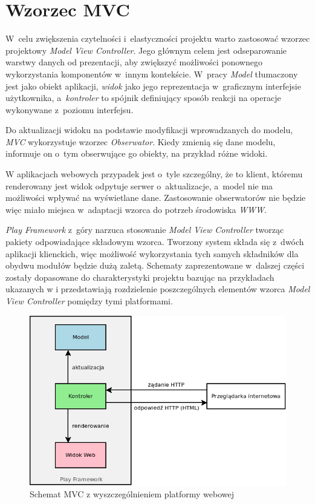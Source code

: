 \documentclass[11pt]{aghdpl}
\begin{document}
\section{Wzorzec MVC}
\label{sec:wzorzecMVC}

W~celu zwiększenia czytelności i~elastyczności projektu warto zastosować wzorzec projektowy \emph{Model View Controller}. Jego głównym celem jest odseparowanie warstwy danych od prezentacji, aby zwiększyć możliwości ponownego wykorzystania komponentów w~innym kontekście. W~pracy\cite{GoF} \emph{Model} tłumaczony jest jako obiekt aplikacji, \emph{widok} jako jego reprezentacja w~graficznym interfejsie użytkownika, a~\emph{kontroler} to spójnik definiujący sposób reakcji na operacje wykonywane z~poziomu interfejsu.

Do aktualizacji widoku na podstawie modyfikacji wprowadzanych do modelu, \emph{MVC} wykorzystuje wzorzec \emph{Obserwator}. Kiedy zmienią się dane modelu, informuje on o~tym obserwujące go obiekty, na przykład różne widoki.

W aplikacjach webowych przypadek jest o~tyle szczególny, że to klient, któremu renderowany jest widok odpytuje serwer o~aktualizacje, a~model nie ma możliwości wpływać na wyświetlane dane. Zastosowanie obserwatorów nie będzie więc miało miejsca w~adaptacji wzorca do potrzeb środowiska \emph{WWW}.

\emph{Play Framework} z~góry narzuca stosowanie \emph{Model View Controller} tworząc pakiety odpowiadające składowym wzorca. Tworzony system składa się z~dwóch aplikacji klienckich, więc możliwość wykorzystania tych samych składników dla obydwu modułów będzie dużą zaletą. Schematy zaprezentowane w~dalszej części zostały dopasowane do charakterystyki projektu bazując na przykładach ukazanych w \cite{PfMC} i przedstawiają rozdzielenie poszczególnych elementów wzorca \emph{Model View Controller} pomiędzy tymi platformami.

\begin{figure}[h!]
	\centering
	\includegraphics[width=\linewidth * 4/5]{MVC-WEB}
	\caption{Schemat MVC z wyszczególnieniem platformy webowej}
	\label{fig:mvc-web}
\end{figure}
\end{document}
